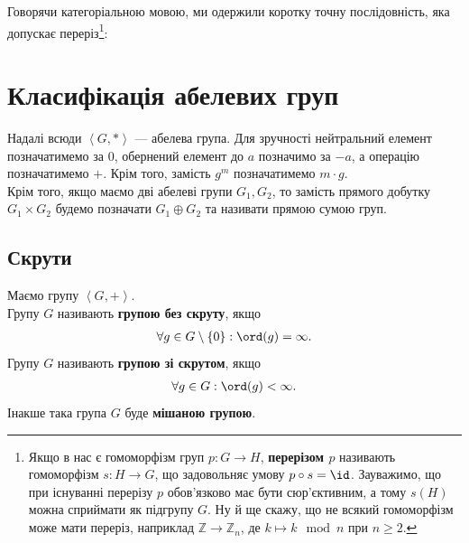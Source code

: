 \documentclass{math_library}
\begin{document}
\begin{remark}
Говорячи категоріальною мовою, ми одержили коротку точну послідовність, яка допускає переріз\footnote{Якщо в нас є гомоморфізм груп $p \colon G \to H$, \textbf{перерізом $p$} називають гомоморфізм $s \colon H \to G$, що задовольняє умову $p \circ s = \id$. Зауважимо, що при існуванні перерізу $p$ обов'язково має бути сюр'єктивним, а тому $s(H)$ можна сприймати як підгрупу $G$. Ну й ще скажу, що не всякий гомоморфізм може мати переріз, наприклад $\mathbb{Z} \to \mathbb{Z}_n$, де $k \mapsto k \mod n$ при $n \geq 2$.}:
\begin{figure}[H]
\centering
{}
\end{figure}
\end{remark}
\newpage

\section{Класифікація абелевих груп}
Надалі всюди $\left< G, *\right>$ --- абелева група. Для зручності нейтральний елемент позначатимемо за $0$, обернений елемент до $a$ позначимо за $-a$, а операцію позначатимемо $+$. Крім того, замість $g^m$ позначатимемо $m \cdot g$.
\bigskip \\
Крім того, якщо маємо дві абелеві групи $G_1,G_2$, то замість прямого добутку $G_1 \times G_2$ будемо позначати $G_1 \oplus G_2$ та називати прямою сумою груп.

\subsection{Скрути}
\begin{definition}
Маємо групу $\left< G, +\right>$.\\
Групу $G$ називають \textbf{групою без скруту}, якщо
\begin{align*}
\forall g \in G \setminus \{0\}: \ord(g) = \infty.
\end{align*}
Групу $G$ називають \textbf{групою зі скрутом}, якщо
\begin{align*}
\forall g \in G: \ord(g) < \infty.
\end{align*}
Інакше така група $G$ буде \textbf{мішаною групою}.
\end{definition}

\end{document}
